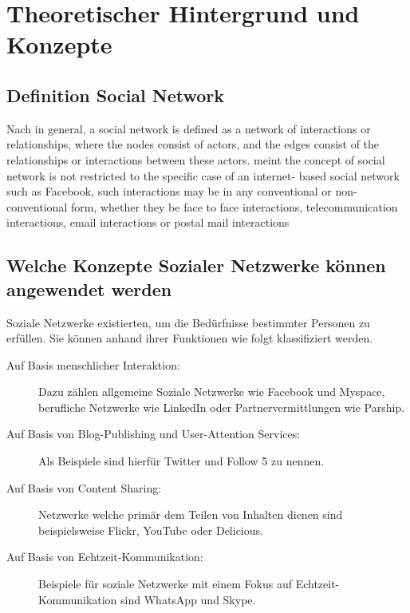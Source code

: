 
\chapter{Theoretischer Hintergrund und Konzepte}


\section{Definition Social Network}


Nach \textcite[S. 2]{aggarwal:sn} \glqq in general, a social network is defined as a network of interactions or relationships, where the nodes consist of actors, and the edges consist of the relationships or interactions between these actors.\grqq \textcite{aggarwal:sn} meint \glqq the concept of social network is not restricted to the specific case of an internet- based social network such as Facebook, such interactions may be in any conventional or non-conventional form, whether they be face to face interactions, telecommunication interactions, email interactions or postal mail interactions\grqq


\section{Welche Konzepte Sozialer Netzwerke können angewendet werden}

Soziale Netzwerke existierten, um die Bedürfnisse bestimmter Personen zu erfüllen. Sie können anhand ihrer Funktionen wie folgt klassifiziert werden.

\begin{description}
\item[Auf Basis menschlicher Interaktion:] Dazu zählen allgemeine Soziale Netzwerke wie Facebook und Myspace, berufliche Netzwerke wie LinkedIn oder Partnervermittlungen wie Parship.
\item[Auf Basis von Blog-Publishing und User-Attention Services:] Als Beispiele sind hierfür Twitter und Follow 5 zu nennen.
\item[Auf Basis von Content Sharing:] Netzwerke welche primär dem Teilen von Inhalten dienen sind beispielsweise Flickr, YouTube oder Delicious.
\item[Auf Basis von Echtzeit-Kommunikation:] Beispiele für soziale Netzwerke mit einem Fokus auf Echtzeit-Kommunikation sind WhatsApp und Skype.
\end{description}

